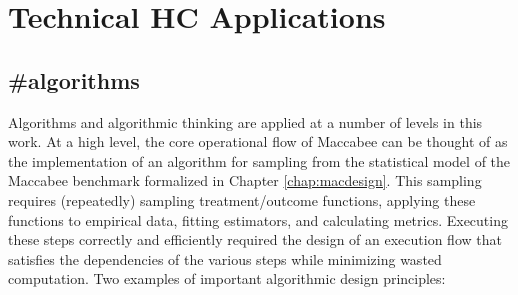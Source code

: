 \documentclass[./main.tex]{subfiles}
\begin{document}

\section{Technical HC Applications}
\label{hc:section-technical}

\subsection*{\textbf{\#algorithms}}
\label{hc:algorithms}

Algorithms and algorithmic thinking are applied at a number of levels in this work. At a high level, the core operational flow of Maccabee can be thought of as the implementation of an algorithm for sampling from the statistical model of the Maccabee benchmark formalized in Chapter \ref{chap:macdesign}. This sampling requires (repeatedly) sampling treatment/outcome functions, applying these functions to empirical data, fitting estimators, and calculating metrics. Executing these steps correctly and efficiently required the design of an execution flow that satisfies the dependencies of the various steps while minimizing wasted computation. Two examples of important algorithmic design principles:
\end{document}
